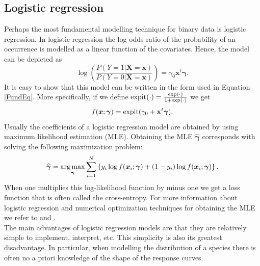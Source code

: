 \subsection{Logistic regression}
Perhaps the most fundamental modelling technique for binary data is logistic regression. In logistic regression the log odds ratio of the probability of an occurrence is modelled as a linear function of the covariates. Hence, the model can be depicted as \[\log \left( \frac{P(Y=1|\bm{X} = \bm{x})}{P(Y=0|\bm{X} = \bm{x})} \right)= \gamma_0 \bm{x}^t \bm{\gamma}.\]
It is easy to show that this model can be written in the form used in Equation \ref{FundEq}. More specifically, if we define $\text{expit}(\cdot) = \frac{\exp(\cdot)}{1+\exp(\cdot)}$ we get \[f(\bm{x};\bm{\gamma}) = \text{expit}(\gamma_0 + \mathbf{x}^t\bm{\gamma}).\] Usually the coefficients of a logistic regression model are obtained by using maximum likelihood estimation (MLE). Obtaining the MLE $\widehat{\bm{\gamma}}$ corresponds with solving the following maximization problem:
\[\widehat{\bm{\gamma}} = \operatorname*{arg\,max}_{\bm{\gamma}} \sum_{i=1}^{N} \left\lbrace y_i \log{f(\bm{x}_i;\bm{\gamma})}  + (1-y_i)\log{f(\bm{x}_i;\bm{\gamma})}  \right\rbrace.\] 
When one multiplies this log-likelihood function by minus one we get a loss function that is often called the cross-entropy. For more information about logistic regression and numerical optimization techniques for obtaining the MLE we refer to \cite{agresti_categorical_2013} and \cite{mccullagh_generalized_1999}. \\

The main advantages of logistic regression models are that they are relatively simple to implement, interpret, etc. This simplicity is also its greatest disadvantage. In particular, when modelling the distribution of a species there is often no a priori knowledge of the shape of the response curves.

